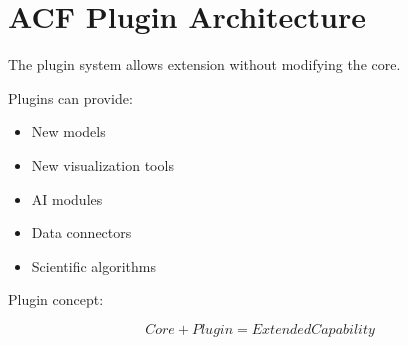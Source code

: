 \section{ACF Plugin Architecture}


The plugin system allows extension without modifying the core.



Plugins can provide:


\begin{itemize}

\item New models

\item New visualization tools

\item AI modules

\item Data connectors

\item Scientific algorithms

\end{itemize}



Plugin concept:


\begin{equation}
Core
+
Plugin
=
Extended Capability
\end{equation}
